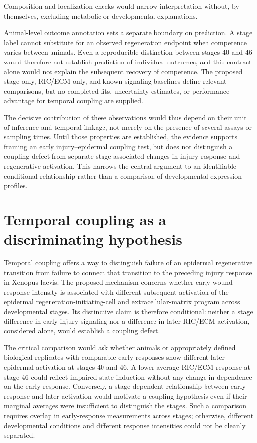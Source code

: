 \documentclass[11pt]{article}
\begin{document}
Composition and localization checks would narrow interpretation without, by themselves, excluding metabolic or developmental explanations.

Animal-level outcome annotation sets a separate boundary on prediction. A stage label cannot substitute for an observed regeneration endpoint when competence varies between animals. Even a reproducible distinction between stages 40 and 46 would therefore not establish prediction of individual outcomes, and this contrast alone would not explain the subsequent recovery of competence. The proposed stage-only, RIC/ECM-only, and known-signaling baselines define relevant comparisons, but no completed fits, uncertainty estimates, or performance advantage for temporal coupling are supplied.

The decisive contribution of these observations would thus depend on their unit of inference and temporal linkage, not merely on the presence of several assays or sampling times. Until those properties are established, the evidence supports framing an early injury–epidermal coupling test, but does not distinguish a coupling defect from separate stage-associated changes in injury response and regenerative activation. This narrows the central argument to an identifiable conditional relationship rather than a comparison of developmental expression profiles.

\section{Temporal coupling as a discriminating hypothesis}
Temporal coupling offers a way to distinguish failure of an epidermal regenerative transition from failure to connect that transition to the preceding injury response in Xenopus laevis. The proposed mechanism concerns whether early wound-response intensity is associated with different subsequent activation of the epidermal regeneration-initiating-cell and extracellular-matrix program across developmental stages. Its distinctive claim is therefore conditional: neither a stage difference in early injury signaling nor a difference in later RIC/ECM activation, considered alone, would establish a coupling defect.

The critical comparison would ask whether animals or appropriately defined biological replicates with comparable early responses show different later epidermal activation at stages 40 and 46. A lower average RIC/ECM response at stage 46 could reflect impaired state induction without any change in dependence on the early response. Conversely, a stage-dependent relationship between early response and later activation would motivate a coupling hypothesis even if their marginal averages were insufficient to distinguish the stages. Such a comparison requires overlap in early-response measurements across stages; otherwise, different developmental conditions and different response intensities could not be cleanly separated.
\end{document}
